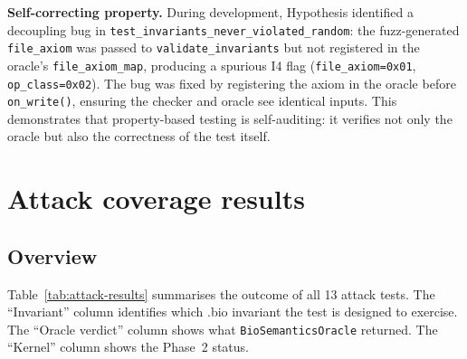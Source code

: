 \documentclass[11pt,a4paper]{article}
\theoremstyle{definition}
\begin{document}
\begin{notebox}
\textbf{Self-correcting property.} During development, Hypothesis identified
a decoupling bug in \nolinkurl{test_invariants_never_violated_random}: the
fuzz-generated \texttt{file\_axiom} was passed to \texttt{validate\_invariants}
but not registered in the oracle's \texttt{file\_axiom\_map}, producing a
spurious I4 flag (\texttt{file\_axiom=0x01}, \texttt{op\_class=0x02}).
The bug was fixed by registering the axiom in the oracle before
\texttt{on\_write()}, ensuring the checker and oracle see identical inputs.
This demonstrates that property-based testing is self-auditing: it verifies
not only the oracle but also the correctness of the test itself.
\end{notebox}

\section{Attack coverage results}

\subsection{Overview}

Table~\ref{tab:attack-results} summarises the outcome of all 13 attack tests.
The ``Invariant'' column identifies which .bio invariant the test is designed
to exercise. The ``Oracle verdict'' column shows what \texttt{BioSemanticsOracle}
returned. The ``Kernel'' column shows the Phase~2 status.
\end{document}
